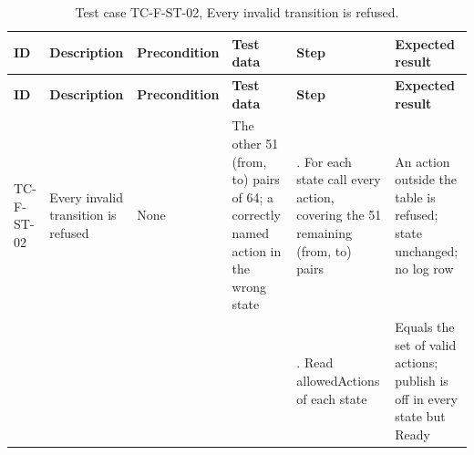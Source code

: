 {\footnotesize{}\renewcommand{\arraystretch}{1.1}
\begin{longtable}{|>{\raggedright\arraybackslash}p{}|>{\raggedright\arraybackslash}p{}|>{\raggedright\arraybackslash}p{}|>{\raggedright\arraybackslash}p{}|>{\raggedright\arraybackslash}p{}|>{\raggedright\arraybackslash}p{}|}
\caption{Test case TC-F-ST-02, Every invalid transition is refused.} \\
\hline
\textbf{ID} & \textbf{Description} & \textbf{Precondition} & \textbf{Test data} & \textbf{Step} & \textbf{Expected result} \\ \hline
\endfirsthead
\hline
\textbf{ID} & \textbf{Description} & \textbf{Precondition} & \textbf{Test data} & \textbf{Step} & \textbf{Expected result} \\ \hline
\endhead
TC-F-ST-02 & Every invalid transition is refused & None & The other 51 (from, to) pairs of 64; a correctly named action in the wrong state & 1. For each state call every action, covering the 51 remaining (from, to) pairs & An action outside the table is refused; state unchanged; no log row \\ \cline{5-6}
 &  &  &  & 2. Read allowedActions of each state & Equals the set of valid actions; publish is off in every state but Ready \\ \hline
\end{longtable}
}

